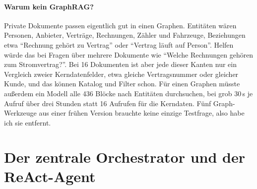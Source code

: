 \paragraph{Warum kein GraphRAG?} Private Dokumente passen eigentlich gut in einen Graphen. Entitäten wären Personen, Anbieter, Verträge, Rechnungen, Zähler und Fahrzeuge, Beziehungen etwa \enquote{Rechnung gehört zu Vertrag} oder \enquote{Vertrag läuft auf Person}. Helfen würde das bei Fragen über mehrere Dokumente wie \enquote{Welche Rechnungen gehören zum Stromvertrag?}. Bei 16 Dokumenten ist aber jede dieser Kanten nur ein Vergleich zweier Kerndatenfelder, etwa gleiche Vertragsnummer oder gleicher Kunde, und das können Katalog und Filter schon. Für einen Graphen müsste außerdem ein Modell alle 436 Blöcke nach Entitäten durchsuchen, bei grob 30\,s je Aufruf über drei Stunden statt 16 Aufrufen für die Kerndaten. Fünf Graph-Werkzeuge aus einer frühen Version brauchte keine einzige Testfrage, also habe ich sie entfernt.

\section{Der zentrale Orchestrator und der ReAct-Agent}
\label{sec:orchestrator}

